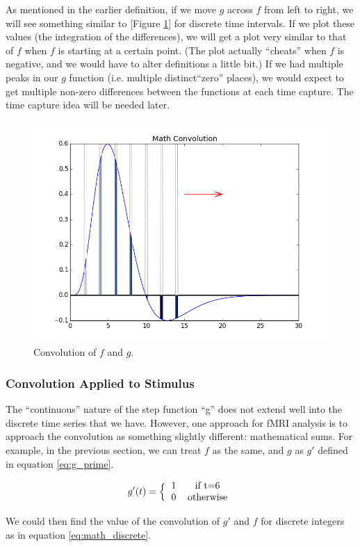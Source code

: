 As mentioned in the earlier definition, if we move $g$ across $f$ from 
left to right, we will see something similar to [Figure \ref{fig:math}] for 
discrete time intervals. If we plot these values (the integration of the 
differences), we will get a plot very similar to that of $f$ when $f$ is 
starting at a certain point. (The plot actually ``cheats'' when $f$ is 
negative, and we would have to alter definitions a little bit.) If we had 
multiple peaks in our $g$ function (i.e. multiple distinct``zero'' places), we 
would expect to get multiple non-zero differences between the functions at each 
time capture. The time capture idea will be needed later.  

\begin{figure}[ht]
	\centering
	\includegraphics[width=.5\linewidth]{../images/math_convolved.png}
	\caption{Convolution of $f$ and $g$.}
	\label{fig:math}
\end{figure}


\subsubsection{Convolution Applied to Stimulus}

The ``continuous'' nature of the step function ``g'' does not extend well into 
the discrete time series that we have. However, one approach for fMRI analysis 
is to approach the convolution as something slightly different: mathematical 
sums. For example, in the previous section, we can treat $f$ as the same, and 
$g$ as $g'$ defined in equation \ref{eq:g_prime}.

\begin{equation}\label{eq:g_prime}
 g'(t)=\Big \{ \begin{tabular}{l c}
 		1  & if t=6\\
 		0  & otherwise \\
 		\end{tabular} \end{equation}

We could then find the value of the convolution of $g'$ and $f$ for discrete 
integers as in equation \ref{eq:math_discrete}.


